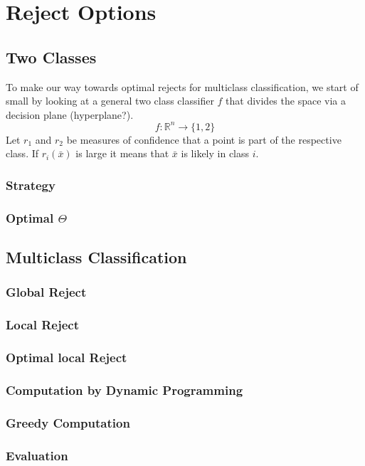 %
\chapter{Reject Options}
\label{sec:options}

\section{Two Classes}
To make our way towards optimal rejects for multiclass classification, we start of small by looking at a general two class classifier $f$ that divides the space via a decision plane (hyperplane?). 
$$f: \mathbb{R}^n \to \{1,2\}$$
Let $r_1$ and $r_2$ be measures of confidence that a point is part of the respective class. If $r_i(\bar{x})$ is large it means that $\bar{x}$ is likely in class $i$.  

\subsection{Strategy}

\subsection{Optimal $\Theta$}

\section{Multiclass Classification}

\subsection{Global Reject}

\subsection{Local Reject}

\subsection{Optimal local Reject}

\subsection{Computation by Dynamic Programming}

\subsection{Greedy Computation}

\subsection{Evaluation}